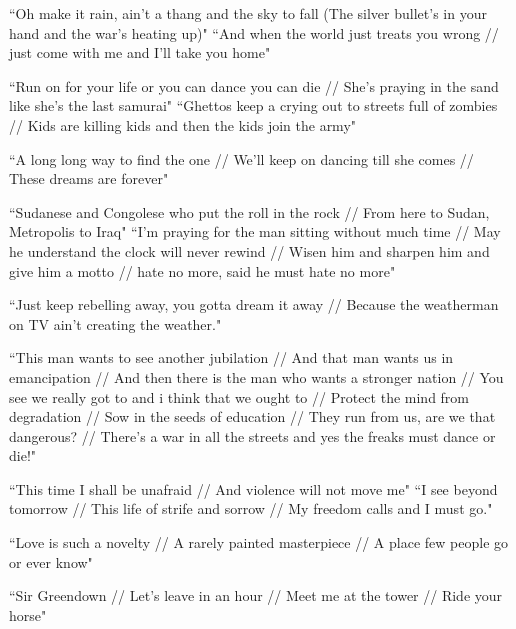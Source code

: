 \documentclass[11pt]{amsart}
\begin{document}
``Oh make it rain, ain't a thang and the sky to fall (The silver bullet's in your hand and the war's heating up)" \cite{manymoons}
``And when the world just treats you wrong // just come with me and I'll take you home" \cite{manymoons}

``Run on for your life or you can dance you can die // She's praying in the sand like she's the last samurai"\cite{danceordie}
``Ghettos keep a crying out to streets full of zombies // Kids are killing kids and then the kids join the army"\cite{danceordie}

``A long long way to find the one // We'll keep on dancing till she comes // These dreams are forever"\cite{danceordie}

``Sudanese and Congolese who put the roll in the rock // From here to Sudan, Metropolis to Iraq"\cite{danceordie}
``I'm praying for the man sitting without much time // May he understand the clock will never rewind // Wisen him and sharpen him and give him a motto // hate no more, said he must hate no more"\cite{danceordie}

``Just keep rebelling away, you gotta dream it away // Because the weatherman on TV ain't creating the weather."\cite{danceordie}


``This man wants to see another jubilation //
And that man wants us in emancipation //
And then there is the man who wants a stronger nation //
You see we really got to and i think that we ought to //
Protect the mind from degradation //
Sow in the seeds of education //
They run from us, are we that dangerous? //
There's a war in all the streets and yes the freaks must dance or die!"\cite{danceordie}

``This time I shall be unafraid // And violence will not move me"\cite{babopbyeya}
``I see beyond tomorrow // This life of strife and sorrow // My freedom calls and I must go."\cite{babopbyeya}

``Love is such a novelty // A rarely painted masterpiece // A place few people go or ever know"\cite{sayyouwillgo}

``Sir Greendown // Let's leave in an hour // Meet me at the tower // Ride your horse"\cite{greendown}

\nocite{*}

{}

\end{document}
